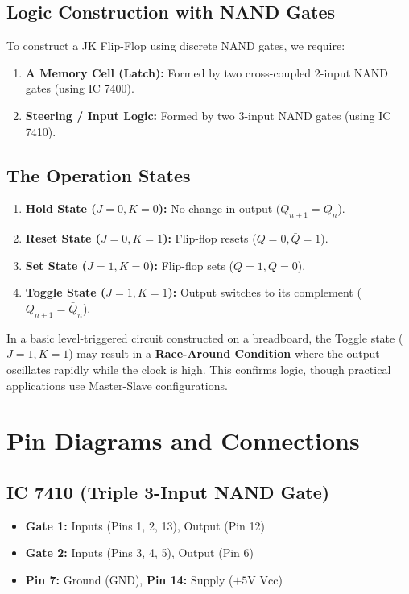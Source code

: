 \subsection{Logic Construction with NAND Gates}
To construct a JK Flip-Flop using discrete NAND gates, we require:
\begin{enumerate}
    \item \textbf{A Memory Cell (Latch):} Formed by two cross-coupled 2-input NAND gates (using IC 7400).
    \item \textbf{Steering / Input Logic:} Formed by two 3-input NAND gates (using IC 7410).
\end{enumerate}

\subsection{The Operation States}
\begin{enumerate}
    \item \textbf{Hold State ($J = 0, K = 0$):} No change in output ($Q_{n+1} = Q_n$).
    \item \textbf{Reset State ($J = 0, K = 1$):} Flip-flop resets ($Q = 0, \bar{Q} = 1$).
    \item \textbf{Set State ($J = 1, K = 0$):} Flip-flop sets ($Q = 1, \bar{Q} = 0$).
    \item \textbf{Toggle State ($J = 1, K = 1$):} Output switches to its complement ($Q_{n+1} = \bar{Q}_n$).
\end{enumerate}

\begin{commonmistake}
In a basic level-triggered circuit constructed on a breadboard, the Toggle state ($J=1, K=1$) may result in a \textbf{Race-Around Condition} where the output oscillates rapidly while the clock is high. This confirms logic, though practical applications use Master-Slave configurations.
\end{commonmistake}

\section{Pin Diagrams and Connections}

\subsection{IC 7410 (Triple 3-Input NAND Gate)}
\begin{itemize}
    \item \textbf{Gate 1:} Inputs (Pins 1, 2, 13), Output (Pin 12)
    \item \textbf{Gate 2:} Inputs (Pins 3, 4, 5), Output (Pin 6)
    \item \textbf{Pin 7:} Ground ($\text{GND}$), \textbf{Pin 14:} Supply ($+5\text{V Vcc}$)
\end{itemize}

